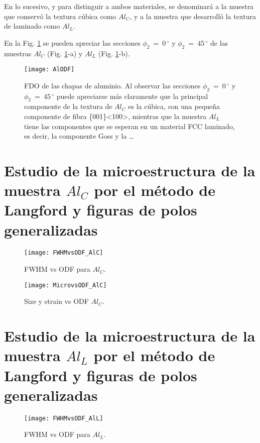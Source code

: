 En lo sucesivo, y para distinguir a ambos materiales, se denominará a la muestra que conservó la textura cúbica como $Al_C$, y a la muestra que desarrolló la textura de laminado como $Al_L$.

En la Fig. \ref{fig:AlODF} se pueden apreciar las secciones $\phi_2 \ = \ 0$\,$^{\circ}$ y $\phi_2 \ = \ 45$\,$^{\circ}$ de las muestras $Al_C$ (Fig. \ref{fig:AlODF}-a) y $Al_L$ (Fig. \ref{fig:AlODF}-b).

\begin{figure}[!htb]
  \centering
  \texttt{[image: AlODF]}
  \caption{FDO de las chapas de aluminio. Al observar las secciones $\phi_2 \ = \ 0$\,$^{\circ}$ y $\phi_2 \ = \ 45$\,$^{\circ}$ puede apreciarse más claramente que la principal componente de la textura de $Al_C$ es la cúbica, con una pequeña componente de fibra \{001\}\textless 100\textgreater, mientras que la muestra $Al_L$ tiene las componentes que se esperan en un material FCC laminado, es decir, la componente Goss y la \ldots}
  \label{fig:AlODF}
\end{figure}

\newpage
\section{Estudio de la microestructura de la muestra $Al_C$ por el método de Langford y figuras de polos generalizadas}\label{S:AlCLANG}

\begin{figure}[!htb]
  \centering
  \texttt{[image: FWHMvsODF\_AlC]}
  \caption{FWHM vs ODF para $Al_C$.}
  \label{fig:AlCFWHMODF}
\end{figure}

\begin{figure}[!htb]
  \centering
  \texttt{[image: MicrovsODF\_AlC]}
  \caption{Size y strain vs ODF $Al_C$.}
  \label{fig:AlCMicro}
\end{figure}

\newpage
\section{Estudio de la microestructura de la muestra $Al_L$ por el método de Langford y figuras de polos generalizadas}\label{S:AlLLANG}
\begin{figure}[!htb]
  \centering
  \texttt{[image: FWHMvsODF\_AlL]}
  \caption{FWHM vs ODF para $Al_L$.}
  \label{fig:AlLFWHMODF}
\end{figure}

